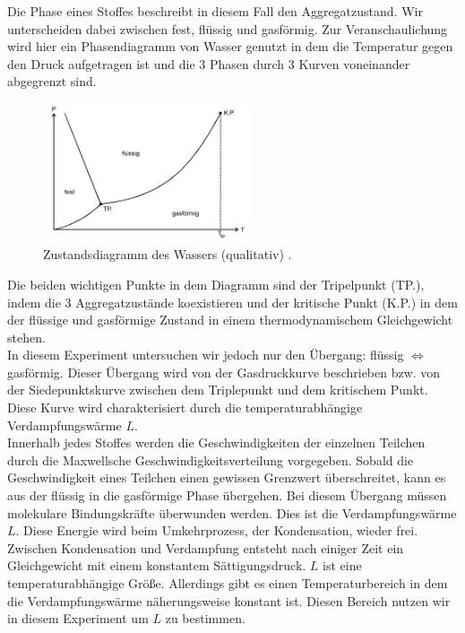 Die \glqq Phase\grqq{} eines Stoffes beschreibt in diesem Fall den Aggregatzustand. Wir unterscheiden dabei zwischen fest, flüssig und gasförmig.
Zur Veranschaulichung wird hier ein Phasendiagramm von Wasser genutzt in dem die Temperatur gegen den Druck aufgetragen ist und die 3 \glqq Phasen\grqq{}
durch 3 Kurven voneinander abgegrenzt sind.\\
\begin{figure}[H]
    \centering
    \includegraphics[width=0.55\textwidth]{images/Diagramm.PNG}
    \caption{Zustandsdiagramm des Wassers (qualitativ) \protect \cite{V203}.}
    \label{img:Zustand}
\end{figure}
Die beiden wichtigen Punkte in dem Diagramm sind der Tripelpunkt (TP.), indem die 
3 Aggregatzustände koexistieren und der kritische Punkt (K.P.) in dem der flüssige und gasförmige Zustand in einem 
thermodynamischem Gleichgewicht stehen.\\
In diesem Experiment untersuchen wir jedoch nur den Übergang: flüssig $\Leftrightarrow$ gasförmig. 
Dieser Übergang wird von der Gasdruckkurve beschrieben bzw. von der Siedepunktskurve zwischen dem Triplepunkt und dem kritischem Punkt.
Diese Kurve wird charakterisiert durch die temperaturabhängige Verdampfungswärme $L$. \\
Innerhalb jedes Stoffes werden die Geschwindigkeiten der einzelnen Teilchen
durch die Maxwellsche Geschwindigkeitsverteilung vorgegeben. Sobald die Geschwindigkeit eines Teilchen einen gewissen Grenzwert 
überschreitet, kann es aus der flüssig in die gasförmige Phase übergehen. Bei diesem Übergang müssen molekulare Bindungskräfte überwunden
werden. Dies ist die Verdampfungswärme $L$. Diese Energie wird beim Umkehrprozess, der Kondensation, wieder frei.\\
Zwischen Kondensation und Verdampfung entsteht nach einiger Zeit ein Gleichgewicht mit einem konstantem Sättigungsdruck.
$L$ ist eine temperaturabhängige Größe. Allerdings gibt es einen Temperaturbereich in dem die Verdampfungswärme näherungsweise konstant ist.
Diesen Bereich nutzen wir in diesem Experiment um $L$ zu bestimmen.\\
